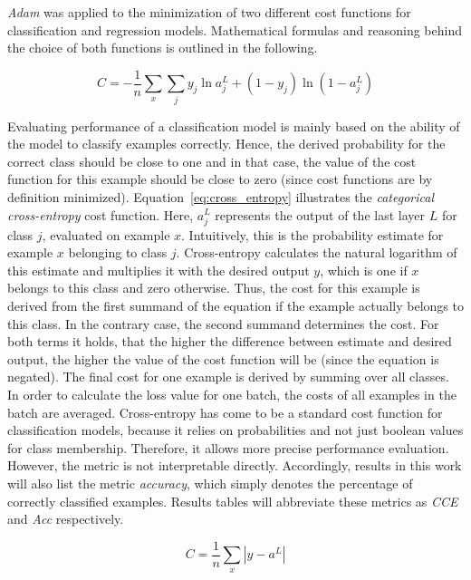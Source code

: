 \textit{Adam} was applied to the minimization of two different cost functions for
classification and regression models.
Mathematical formulas and reasoning behind the choice of both functions
is outlined in the following.

\begin{equation}
  \label{eq:cross_entropy}
  C = -\frac{1}{n} \sum_x \sum_j y_j \ln a_j^L + (1 - y_j) \ln (1 - a_j^L)
\end{equation}

Evaluating performance of a classification model is mainly based on the ability
of the model to classify examples correctly.
Hence, the derived probability for the correct class should be close to one and
in that case, the value of the cost function for this example should be close
to zero (since cost functions are by definition minimized).
Equation~\ref{eq:cross_entropy} illustrates the \textit{categorical cross-entropy}
cost function. Here, $a_j^L$ represents the output of the last layer $L$ for class $j$,
evaluated on example $x$.
Intuitively, this is the probability estimate for example $x$ belonging to class $j$.
Cross-entropy calculates the natural logarithm of this estimate and multiplies
it with the desired output $y$, which is one if $x$ belongs to this class and
zero otherwise.
Thus, the cost for this example is derived from the first summand of the equation
if the example actually belongs to this class.
In the contrary case, the second summand determines the cost.
For both terms it holds, that the higher the difference between estimate and desired
output, the higher the value of the cost function will be (since the equation is negated).
The final cost for one example is derived by summing over all classes.
In order to calculate the loss value for one batch, the costs of all examples
in the batch are averaged.
Cross-entropy has come to be a standard cost function for classification
models, because it relies on probabilities and not just boolean values for class
membership.
Therefore, it allows more precise performance evaluation.
However, the metric is not interpretable directly.
Accordingly, results in this work will also list the metric \textit{accuracy}, which simply
denotes the percentage of correctly classified examples.
Results tables will abbreviate these metrics as \textit{CCE} and \textit{Acc}
respectively.

\begin{equation}
  \label{eq:mae}
  C = \frac{1}{n} \sum_x |y - a^L|
\end{equation}

